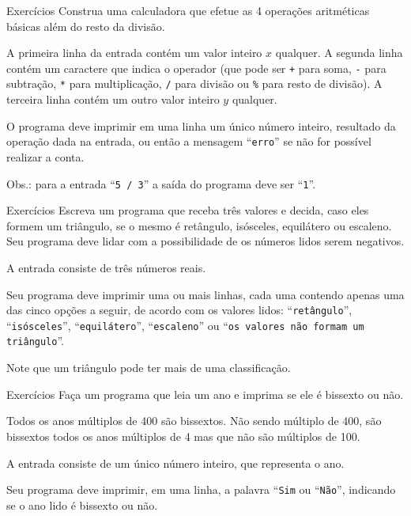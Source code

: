 \documentclass[handout]{beamer}
\begin{document}
\begin{frame}[fragile]{Exercícios}
  Construa uma calculadora que efetue as 4 operações aritméticas
  básicas além do resto da divisão.

    A primeira linha da entrada contém um valor inteiro $x$ qualquer.
    A segunda linha contém um caractere que indica o operador (que pode ser \texttt{+} para soma, \texttt{-} para subtração, \texttt{*} para multiplicação, \texttt{/} para divisão ou \texttt{\%} para resto de divisão).
    A terceira linha contém um outro valor inteiro $y$ qualquer.

    O programa deve imprimir em uma linha um único número inteiro, resultado da operação dada na entrada, ou então a mensagem ``\texttt{erro}'' se não for possível realizar a conta.

    Obs.: para a entrada ``\texttt{5 / 3}'' a saída do programa deve ser ``\texttt{1}''.
\end{frame}

\begin{frame}[fragile]{Exercícios}
    Escreva um programa que receba três valores e decida, caso eles formem um triângulo, se o mesmo é retângulo, isósceles, equilátero ou escaleno. Seu programa deve lidar com a possibilidade de os números lidos serem negativos.

    A entrada consiste de três números reais.

    Seu programa deve imprimir uma ou mais linhas, cada uma contendo apenas uma das cinco opções a seguir, de acordo com os valores lidos: ``\texttt{retângulo}'', ``\texttt{isósceles}'', ``\texttt{equilátero}'', ``\texttt{escaleno}'' ou ``\texttt{os valores não formam um triângulo}''.

    Note que um triângulo pode ter mais de uma classificação.
\end{frame}

\begin{frame}[fragile]{Exercícios}
    Faça um programa que leia um ano e imprima se ele é bissexto ou não.

    Todos os anos múltiplos de 400 são bissextos.
    Não sendo múltiplo de 400, são bissextos todos os anos múltiplos de 4 mas que não são múltiplos de 100.

    A entrada consiste de um único número inteiro, que representa o ano.

    Seu programa deve imprimir, em uma linha, a palavra ``\texttt{Sim} ou ``\texttt{Não}'', indicando se o ano lido é bissexto ou não.
\end{frame}
\end{document}
